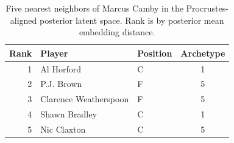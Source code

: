 \begin{table}[htbp]
  \centering\small
  \begin{tabular}{rllc}
    \toprule
    Rank & Player & Position & Archetype \\
    \midrule
    1 & Al Horford & C & 1 \\
    2 & P.J. Brown & F & 5 \\
    3 & Clarence Weatherspoon & F & 5 \\
    4 & Shawn Bradley & C & 1 \\
    5 & Nic Claxton & C & 5 \\
    \bottomrule
  \end{tabular}
  \caption{Five nearest neighbors of Marcus Camby in the Procrustes-aligned posterior latent space. Rank is by posterior mean embedding distance.}
  \label{tab:Marcus_Camby_neighbors}
\end{table}

